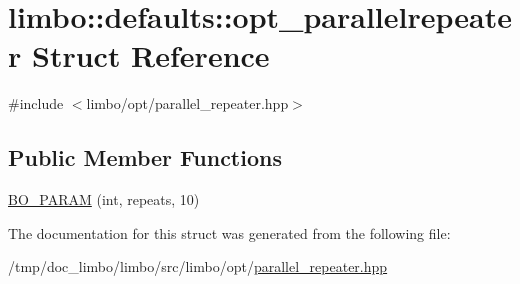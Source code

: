 \hypertarget{structlimbo_1_1defaults_1_1opt__parallelrepeater}{}\section{limbo\+:\+:defaults\+:\+:opt\+\_\+parallelrepeater Struct Reference}
\label{structlimbo_1_1defaults_1_1opt__parallelrepeater}


{\ttfamily \#include $<$limbo/opt/parallel\+\_\+repeater.\+hpp$>$}

\subsection*{Public Member Functions}
\begin{DoxyCompactItemize}
\item 
\hyperlink{group__opt__defaults_ga4dfaebabf04a129cbb565807ed31f2de}{B\+O\+\_\+\+P\+A\+R\+A\+M} (int, repeats, 10)
\end{DoxyCompactItemize}


The documentation for this struct was generated from the following file\+:\begin{DoxyCompactItemize}
\item 
/tmp/doc\+\_\+limbo/limbo/src/limbo/opt/\hyperlink{parallel__repeater_8hpp}{parallel\+\_\+repeater.\+hpp}\end{DoxyCompactItemize}
